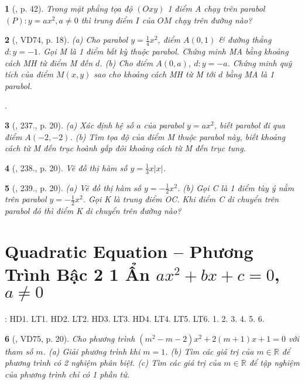 \documentclass{article}
\newtheorem{baitoan}{}
\begin{document}
\begin{baitoan}[\cite{Binh_boi_duong_Toan_9_tap_2}, p. 42]
	Trong mặt phẳng tọa độ $(Oxy)$ 1 điểm A chạy trên parabol $(P):y = ax^2,a\ne0$ thì trung điểm $I$ của $OM$ chạy trên đường nào?
\end{baitoan}

\begin{baitoan}[\cite{Binh_Toan_9_tap_2}, VD74, p. 18]
	(a) Cho parabol $y = \frac{1}{4}x^2$, điểm $A(0,1)$ \& đường thẳng $d:y = -1$. Gọi M là 1 điểm bất kỳ thuộc parabol. Chứng minh MA bằng khoảng cách MH từ điểm M đến $d$. (b) Cho điểm $A(0,a)$, $d:y = -a$. Chứng minh quỹ tích của điểm $M(x,y)$ sao cho khoảng cách MH từ M tới $d$ bằng MA là 1 parabol.
\end{baitoan}
\noindent\cite[235., p. 19, 236., p. 20]{Binh_Toan_9_tap_2}.

\begin{baitoan}[\cite{Binh_Toan_9_tap_2}, 237., p. 20]
	(a) Xác định hệ số $a$ của parabol $y = ax^2$, biết parabol đi qua điểm $A(-2,-2)$. (b) Tìm tọa độ của điểm M thuộc parabol này, biết khoảng cách từ M đến trục hoành gấp đôi khoảng cách từ M đến trục tung.
\end{baitoan}

\begin{baitoan}[\cite{Binh_Toan_9_tap_2}, 238., p. 20]
	Vẽ đồ thị hàm số $y = \frac{1}{3}x|x|$.
\end{baitoan}

\begin{baitoan}[\cite{Binh_Toan_9_tap_2}, 239., p. 20]
	(a) Vẽ đồ thị hàm số $y = -\frac{1}{2}x^2$. (b) Gọi C là 1 điểm tùy ý nằm trên parabol $y = -\frac{1}{2}x^2$. Gọi K là trung điểm OC. Khi điểm C di chuyển trên parabol đó thì điểm K di chuyển trên đường nào?
\end{baitoan}


\section{Quadratic Equation -- Phương Trình Bậc 2 1 Ẩn $ax^2 + bx + c = 0$, $a\ne0$}
\cite[Chap. VII, \S2, pp. 52--60]{SGK_Toan_9_Canh_Dieu_tap_2}: HD1. LT1. HD2. LT2. HD3. LT3. HD4. LT4. LT5. LT6. 1. 2. 3. 4. 5. 6.

\begin{baitoan}[\cite{Binh_Toan_9_tap_2}, VD75, p. 20]
	Cho phương trình $(m^2 - m - 2)x^2 + 2(m + 1)x + 1 = 0$ với tham số $m$. (a) Giải phương trình khi $m = 1$. (b) Tìm các giá trị của $m\in\mathbb{R}$ để phương trình có 2 nghiệm phân biệt. (c) Tìm các giá trị của $m\in\mathbb{R}$ để tập nghiệm của phương trình chỉ có 1 phần tử.
\end{baitoan}
\end{document}
